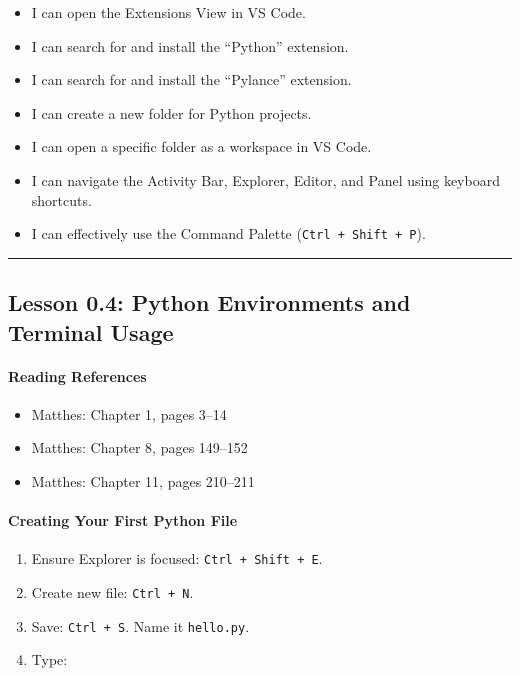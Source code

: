 \documentclass[
  justified,
  openright,
]{tufte-book}
\let\subsubsection\paragraph
\let\paragraph\paragraph
\let\subsubsection\paragraph
\let\paragraph\paragraph
\providecommand{\tightlist}{%
  \setlength{\itemsep}{0pt}\setlength{\parskip}{0pt}}
\begin{document}
\begin{itemize}
\tightlist
\item[$\square$]
  I can open the Extensions View in VS Code.
\item[$\square$]
  I can search for and install the ``Python'' extension.
\item[$\square$]
  I can search for and install the ``Pylance'' extension.
\item[$\square$]
  I can create a new folder for Python projects.
\item[$\square$]
  I can open a specific folder as a workspace in VS Code.
\item[$\square$]
  I can navigate the Activity Bar, Explorer, Editor, and Panel using
  keyboard shortcuts.
\item[$\square$]
  I can effectively use the Command Palette
  (\texttt{Ctrl\ +\ Shift\ +\ P}).
\end{itemize}

\begin{center}\rule{0.5\linewidth}{0.5pt}\end{center}

\subsection{Lesson 0.4: Python Environments and Terminal
Usage}\label{lesson-0.4-python-environments-and-terminal-usage-1}

\subsubsection{Reading References}\label{reading-references-3}

\begin{itemize}
\tightlist
\item
  Matthes: Chapter 1, pages 3--14
\item
  Matthes: Chapter 8, pages 149--152
\item
  Matthes: Chapter 11, pages 210--211
\end{itemize}

\subsubsection{Creating Your First Python
File}\label{creating-your-first-python-file}

\begin{enumerate}
\def\labelenumi{\arabic{enumi}.}
\tightlist
\item
  Ensure Explorer is focused: \texttt{Ctrl\ +\ Shift\ +\ E}.
\item
  Create new file: \texttt{Ctrl\ +\ N}.
\item
  Save: \texttt{Ctrl\ +\ S}. Name it \texttt{hello.py}.
\item
  Type:
\end{enumerate}
\end{document}
